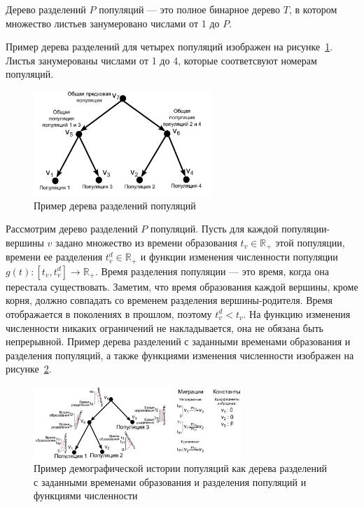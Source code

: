 \documentclass[a4paper,14pt,oneside,openany,article]{memoir}
\begin{document}
 Дерево разделений $P$ популяций --- это полное бинарное дерево $T$, в котором множество листьев занумеровано числами от 1 до $P$.

Пример дерева разделений для четырех популяций изображен на рисунке~\ref{fig:dem_tree}.
Листья занумерованы числами от 1 до 4, которые соответсвуют номерам популяций.

\begin{figure}[h]
    \centering
    \includegraphics[width=0.6\textwidth]{images_2/dem_hist_tree.pdf}
    \caption{Пример дерева разделений популяций}
    \label{fig:dem_tree}
\end{figure}

Рассмотрим дерево разделений $P$ популяций.
Пусть для каждой популяции-вершины $v$ задано множество из времени образования $t_v \in \mathbb{R}_+$ этой популяции, времени ее разделения $t^d_v \in \mathbb{R}_+$ и функции изменения численности популяции $g(t): [t_v, t^d_v] \to \mathbb{R}_+$.
Время разделения популяции --- это время, когда она перестала существовать.
Заметим, что время образования каждой вершины, кроме корня, должно совпадать со временем разделения вершины-родителя.
Время отображается в поколениях в прошлом, поэтому $t^d_v < t_v$.
На функцию изменения численности никаких ограничений не накладывается, она не обязана быть непрерывной.
Пример дерева разделений с заданными временами образования и разделения популяций, а также функциями изменения численности изображен на рисунке~\ref{fig:dem_def}.


\begin{figure}[h]
    \centering
    \includegraphics[width=0.7\textwidth]{images_2/dem_hist_def.pdf}
    \caption{Пример демографической истории популяций как дерева разделений с заданными временами образования и разделения популяций и функциями численности}
    \label{fig:dem_def}
\end{figure}
\end{document}
